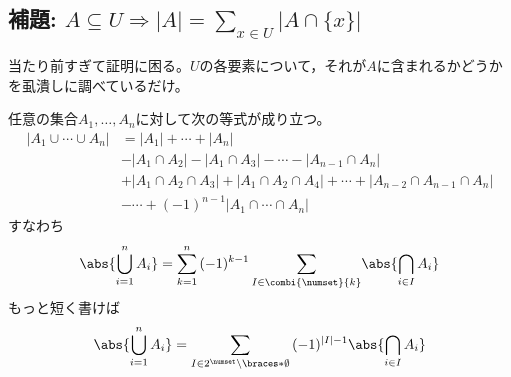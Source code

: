         \subsection{補題: \texorpdfstring{$A\subseteq U \Rightarrow |A| = \sum_{x\in U}{|A\cap\{x\}|}$}{A⊆Uのときの|A|の計算}}
            \label{補題: 要素数のカウント。親集合の各要素について子集合に含まれるかどうか調べる。}
            \begin{commentary}
                \quad\par
                当たり前すぎて証明に困る。$U$の各要素について，それが$A$に含まれるかどうかを虱潰しに調べているだけ。
            \end{commentary}
            \begin{shadebox}
                任意の集合$A_1,\dotsc,A_n$に対して次の等式が成り立つ。
                \begin{align*}
                    |A_1\cup\dotsb\cup A_n| &= |A_1|+\dotsb +|A_n| \\
                    &- |A_1\cap A_2| - |A_1\cap A_3| - \dotsb - |A_{n-1}\cap A_n| \\
                    &+ |A_1\cap A_2\cap A_3| + |A_1\cap A_2\cap A_4| + \dotsb + |A_{n-2}\cap A_{n-1}\cap A_n| \\
                    &- \dotsb +(-1)^{n-1}|A_1\cap\dotsb\cap A_n|
                \end{align*}
                すなわち
                \begin{equation}
                    \abs{\bigcup_{i=1}^n A_i} = \sum_{k=1}^n{(-1)^{k-1}\sum_{I\in\combi{\numset}{k}}}{\abs{\bigcap_{i\in I}A_i}}
                \end{equation}
                もっと短く書けば
                \[\abs{\bigcup_{i=1}^n A_i} = \sum_{I\in 2^\numset\setminus\braces*{\emptyset}}{(-1)^{|I|-1}\abs{\bigcap_{i\in I}A_i}}\]
            \end{shadebox}
